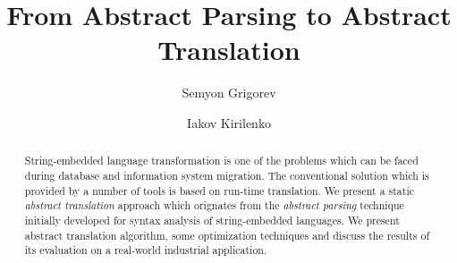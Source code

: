 \documentclass{llncs}
\begin{document}
\sloppy
%
%
%
%
%
%
\title{From Abstract Parsing to Abstract Translation}
%
%
\author{Semyon Grigorev 
\and Iakov Kirilenko
}
%
%



\maketitle              %

\begin{abstract}
String-embedded language transformation is one of the problems which can be faced during 
database and information system migration. The conventional solution which
is provided by a number of tools is based on run-time translation. We present a static 
\emph{abstract translation} approach which orignates from the \emph{abstract parsing} 
technique~\cite{AbstrParsing} initially developed for syntax analysis of string-embedded 
languages. We present abstract translation algorithm, some optimization techniques and
discuss the results of its evaluation on a real-world industrial application.


\end{abstract}
\end{document}
